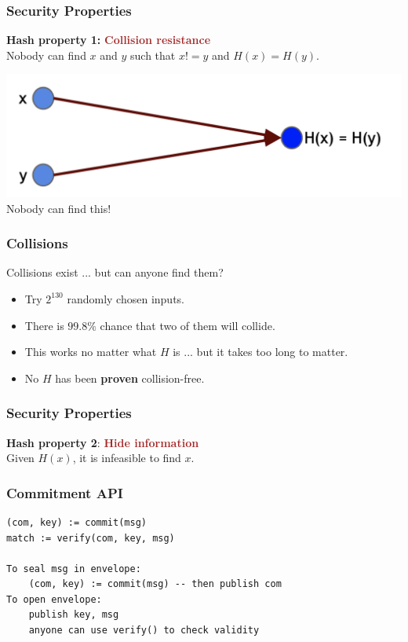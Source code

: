 \documentclass{beamer}
\begin{document}
\begin{frame}
  \frametitle{Security Properties}
  
  \begin{block}{\textbf{Hash property 1:}}
  \textcolor{brown}{\textbf{Collision resistance}} \\
Nobody can find $x$ and $y$ such that $x != y$ and $H(x)=H(y)$.
 	\end{block}
	\centering
	\includegraphics[scale=0.5]{property1} 
	Nobody can find this!
\end{frame}
\begin{frame}
  \frametitle{Collisions}
  Collisions exist ... \pause but can anyone find them?
	\begin{itemize}
		\item Try $2^{130}$ randomly chosen inputs.
		\item There is $99.8\%$ chance that two of them will collide. \pause 
		\item This works no matter what $H$ is ... \pause but it takes too long to matter.
		\pause
		\item No $H$ has been \textbf{proven} collision-free.
	\end{itemize}

\end{frame}
\begin{frame}
  \frametitle{Security Properties}
  
  \begin{block}{\textbf{Hash property 2}:}
  \textcolor{brown}{\textbf{Hide information}} \\
Given $H(x)$, it is infeasible to find $x$.
 	\end{block}
\end{frame}
\begin{frame}[fragile]
  \frametitle{Commitment API}
	\begin{verbatim}
(com, key) := commit(msg)
match := verify(com, key, msg)

To seal msg in envelope:
    (com, key) := commit(msg) -- then publish com
To open envelope:
    publish key, msg
    anyone can use verify() to check validity

	\end{verbatim}
\end{frame}
\end{document}
